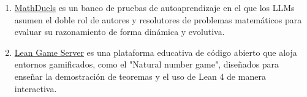 \documentclass[12pt,a4paper]{article}
\begin{document}
\begin{enumerate}
\item \href{https://www.rabdos.ai/research/introducing-mathduels-ai}{MathDuels} es un banco de pruebas de autoaprendizaje en el que los LLMs asumen el doble rol de autores y resolutores de problemas matemáticos para evaluar su razonamiento de forma dinámica y evolutiva.
\item \href{https://adam.math.hhu.de/}{Lean Game Server} es una plataforma educativa de código abierto que aloja entornos gamificados, como el "Natural number game", diseñados para enseñar la demostración de teoremas y el uso de Lean 4 de manera interactiva.
\end{enumerate}
\end{document}
